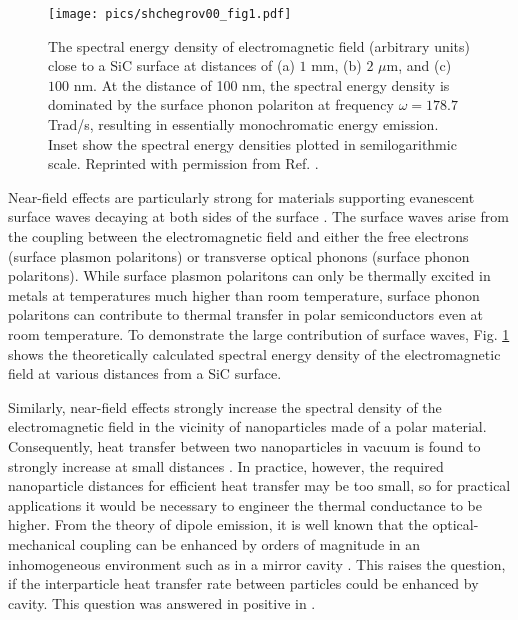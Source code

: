 \begin{figure}
\begin{center}
 \texttt{[image: pics/shchegrov00\_fig1.pdf]}
 \caption{The spectral energy density of electromagnetic field (arbitrary units) close to a SiC surface at distances of (a) $1$ mm, (b) $2$ $\mu$m, and (c) $100$ nm. At the distance of 100 nm, the spectral energy density is dominated by the surface phonon polariton at frequency $\omega=178.7$ Trad/s, resulting in essentially monochromatic energy emission. Inset show the spectral energy densities plotted in semilogarithmic scale. Reprinted with permission from Ref. \cite{shchegrov00}.}
\label{fig:intro_shchegrov}
\end{center}
\end{figure} 

Near-field effects are particularly strong for materials supporting evanescent surface waves decaying at both sides of the surface \cite{shchegrov00}. The surface waves arise from the coupling between the electromagnetic field and either the free electrons (surface plasmon polaritons) or transverse optical phonons (surface phonon polaritons). While surface plasmon polaritons can only be thermally excited in metals at temperatures much higher than room temperature, surface phonon polaritons can contribute to thermal transfer in polar semiconductors even at room temperature. To demonstrate the large contribution of surface waves, Fig. \ref{fig:intro_shchegrov} shows the theoretically calculated \cite{shchegrov00} spectral energy density of the electromagnetic field at various distances from a SiC surface.

Similarly, near-field effects strongly increase the spectral density of the electromagnetic field in the vicinity of nanoparticles made of a polar material. Consequently, heat transfer between two nanoparticles in vacuum is found to strongly increase at small distances \cite{domingues05}. In practice, however, the required nanoparticle distances for efficient heat transfer may be too small, so for practical applications it would be necessary to engineer the thermal conductance to be higher. From the theory of dipole emission, it is well known that the optical-mechanical coupling can be enhanced by orders of magnitude in an inhomogeneous environment such as in a mirror cavity \cite{novotny}. This raises the question, if the interparticle heat transfer rate between particles could be enhanced by cavity. This question was answered in positive in .

